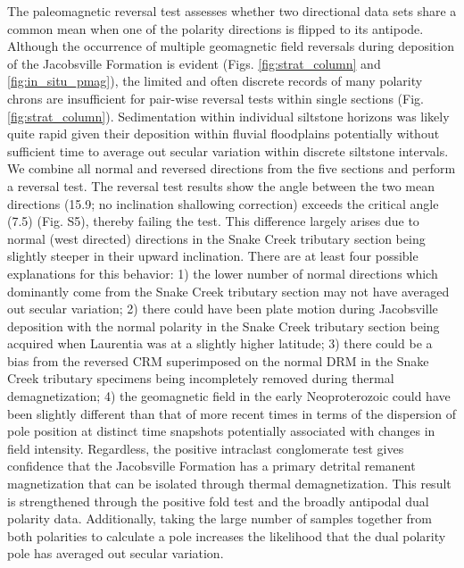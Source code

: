 The paleomagnetic reversal test assesses whether two directional data sets share a common mean when one of the polarity directions is flipped to its antipode. Although the occurrence of multiple geomagnetic field reversals during deposition of the Jacobsville Formation is evident (Figs. \ref{fig:strat_column} and \ref{fig:in_situ_pmag}), the limited and often discrete records of many polarity chrons are insufficient for pair-wise reversal tests within single sections (Fig. \ref{fig:strat_column}). Sedimentation within individual siltstone horizons was likely quite rapid given their deposition within fluvial floodplains potentially without sufficient time to average out secular variation within discrete siltstone intervals. We combine all normal and reversed directions from the five sections and perform a reversal test. The  reversal test results show the angle between the two mean directions (15.9\textdegree; no inclination shallowing correction) exceeds the critical angle (7.5\textdegree) (Fig. S5), thereby failing the test. This difference largely arises due to normal (west directed) directions in the Snake Creek tributary section being slightly steeper in their upward inclination. There are at least four possible explanations for this behavior: 1) the lower number of normal directions which dominantly come from the Snake Creek tributary section may not have averaged out secular variation; 2) there could have been plate motion during Jacobsville deposition with the normal polarity in the Snake Creek tributary section being acquired when Laurentia was at a slightly higher latitude; 3) there could be a bias from the reversed CRM superimposed on the normal DRM in the Snake Creek tributary specimens being incompletely removed during thermal demagnetization; 4) the geomagnetic field in the early Neoproterozoic could have been slightly different than that of more recent times in terms of the dispersion of pole position at distinct time snapshots potentially associated with changes in field intensity. Regardless, the positive intraclast conglomerate test gives confidence that the Jacobsville Formation has a primary detrital remanent magnetization that can be isolated through thermal demagnetization. This result is strengthened through the positive fold test and the broadly antipodal dual polarity data. Additionally, taking the large number of samples together from both polarities to calculate a pole increases the likelihood that the dual polarity pole has averaged out secular variation.

